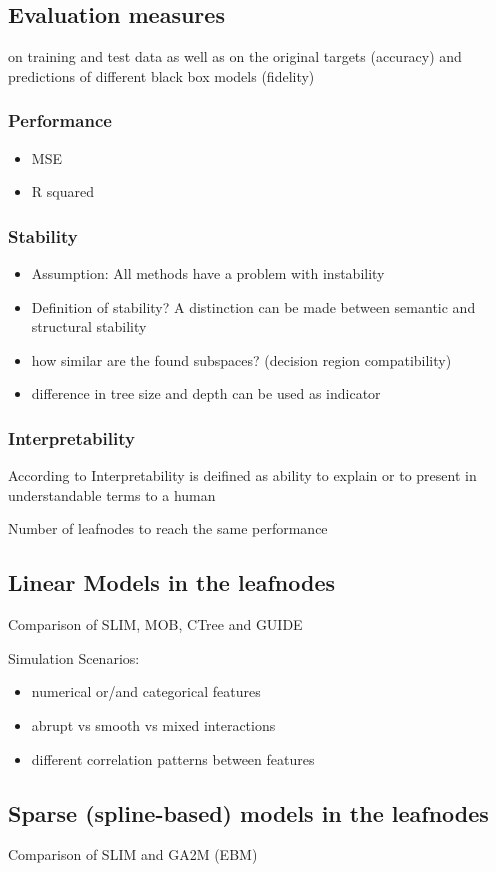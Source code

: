 \subsection{Evaluation measures}
on training and test data as well as on the original targets (accuracy) and predictions of different black box models (fidelity)
\subsubsection{Performance}
\begin{itemize}
    \item MSE
    \item R squared
\end{itemize}

\subsubsection{Stability}

\begin{itemize}
    \item Assumption: All methods have a problem with instability \citep{Fokkema.2020}
    \item Definition of stability? A distinction can be made between semantic and structural stability \citep{Wang.2018}
    \item how similar are the found subspaces? (decision region compatibility) \citep{Wang.2018}

    \item difference in tree size and depth can be used as indicator \citep{Wang.2018}


\end{itemize}






\subsubsection{Interpretability}
According to \citet{DoshiVelez.2017} Interpretability is deifined as ability to explain or to present in understandable
terms to a human

Number of leafnodes to reach the same performance

\subsection{Linear Models in the leafnodes}
Comparison of SLIM, MOB, CTree and GUIDE

Simulation Scenarios:
\begin{itemize}
    \item numerical or/and categorical features
    \item abrupt vs smooth vs mixed interactions
    \item different correlation patterns between features
\end{itemize}


\subsection{Sparse (spline-based) models in the leafnodes}
Comparison of SLIM and GA2M (EBM)